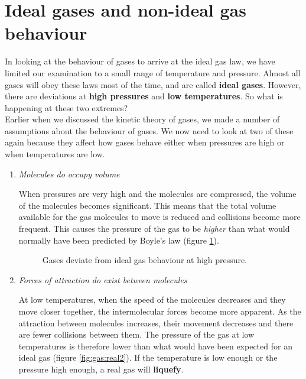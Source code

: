 
\section{Ideal gases and non-ideal gas behaviour}
\label{sec:gases:ideal}

In looking at the behaviour of gases to arrive at the ideal gas law, we have limited our examination to a small range of temperature and pressure. Almost all gases will obey these laws most of the time, and are called \textbf{ideal gases}. However, there are deviations at \textbf{high pressures} and \textbf{low temperatures}. So what is happening at these two extremes? \\

Earlier when we discussed the kinetic theory of gases, we made a number of assumptions about the behaviour of gases. We now need to look at two of these again because they affect how gases behave either when pressures are high or when temperatures are low.

\begin{enumerate}
\item{\textit{Molecules do occupy volume}}

When pressures are very high and the molecules are compressed, the volume of the molecules becomes significant. This means that the total volume available for the gas molecules to move is reduced and collisions become more frequent. This causes the pressure of the gas to be \textit{higher} than what would normally have been predicted by Boyle's law (figure \ref{fig:gas:real1}).

\begin{figure}[H]
\begin{center}
\end{center}
\caption{Gases deviate from ideal gas behaviour at high pressure.}
\label{fig:gas:real1}
\end{figure}


\item{\textit{Forces of attraction do exist between molecules}}

At low temperatures, when the speed of the molecules decreases and they move closer together, the intermolecular forces become more apparent. As the attraction between molecules increases, their movement decreases and there are fewer collisions between them. The pressure of the gas at low temperatures is therefore lower than what would have been expected for an ideal gas (figure \ref{fig:gas:real2}). If the temperature is low enough or the pressure high enough, a real gas will \textbf{liquefy}.
\end{enumerate}

